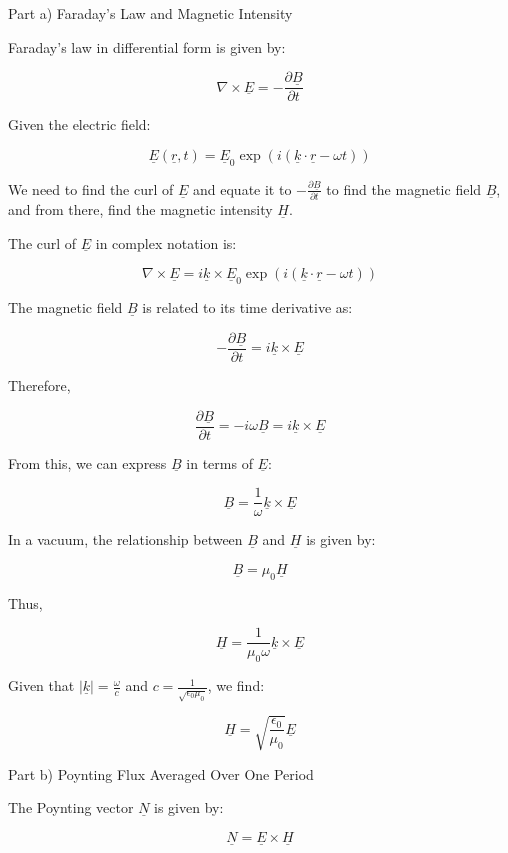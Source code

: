 Part a) Faraday’s Law and Magnetic Intensity

Faraday's law in differential form is given by:

\[
\nabla \times \underline{E} = -\frac{\partial \underline{B}}{\partial t}
\]

Given the electric field:

\[
\underline{E}(\underline{r}, t) = \underline{E}_{0} \exp(i(\underline{k} \cdot \underline{r} - \omega t))
\]

We need to find the curl of \(\underline{E}\) and equate it to \(-\frac{\partial \underline{B}}{\partial t}\) to find the magnetic field \(\underline{B}\), and from there, find the magnetic intensity \(\underline{H}\).

The curl of \(\underline{E}\) in complex notation is:

\[
\nabla \times \underline{E} = i\underline{k} \times \underline{E}_{0} \exp(i(\underline{k} \cdot \underline{r} - \omega t))
\]

The magnetic field \(\underline{B}\) is related to its time derivative as:

\[
-\frac{\partial \underline{B}}{\partial t} = i\underline{k} \times \underline{E}
\]

Therefore,

\[
\frac{\partial \underline{B}}{\partial t} = -i\omega \underline{B} = i\underline{k} \times \underline{E}
\]

From this, we can express \(\underline{B}\) in terms of \(\underline{E}\):

\[
\underline{B} = \frac{1}{\omega} \underline{k} \times \underline{E}
\]

In a vacuum, the relationship between \(\underline{B}\) and \(\underline{H}\) is given by:

\[
\underline{B} = \mu_{0} \underline{H}
\]

Thus,

\[
\underline{H} = \frac{1}{\mu_{0}\omega} \underline{k} \times \underline{E}
\]

Given that \(|\underline{k}| = \frac{\omega}{c}\) and \(c = \frac{1}{\sqrt{\epsilon_{0}\mu_{0}}}\), we find:

\[
\underline{H} = \sqrt{\frac{\epsilon_{0}}{\mu_{0}}} \underline{E}
\]

Part b) Poynting Flux Averaged Over One Period

The Poynting vector \(\underline{N}\) is given by:

\[
\underline{N} = \underline{E} \times \underline{H}
\]

